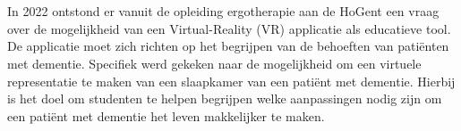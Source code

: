 
\chapter{}%
\label{ch:inleiding}

\section{}%
\label{sec:probleemstelling}



In 2022 ontstond er vanuit de opleiding ergotherapie aan de HoGent een vraag over de mogelijkheid van een Virtual-Reality (VR) applicatie als educatieve tool. De applicatie moet zich richten op het begrijpen van de behoeften van patiënten met dementie. Specifiek werd gekeken naar de mogelijkheid om een virtuele representatie te maken van een slaapkamer van een patiënt met dementie. Hierbij is het doel om studenten te helpen begrijpen welke aanpassingen nodig zijn om een patiënt met dementie het leven makkelijker te maken.

